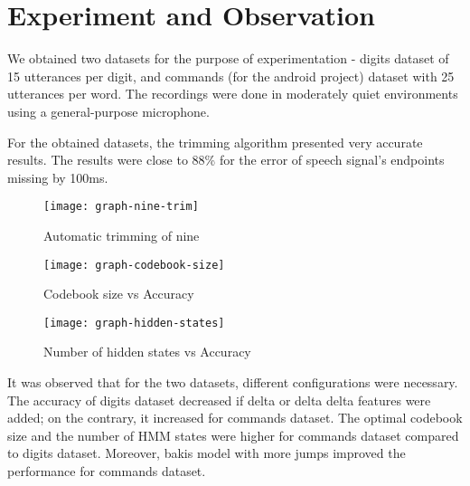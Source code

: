 \chapter{Experiment and Observation} \label{ch:experiment}

We obtained two datasets for the purpose of experimentation - digits dataset of 15 utterances per digit, and commands (for the android project) dataset with 25 utterances per word. The recordings were done in moderately quiet environments using a general-purpose microphone.

For the obtained datasets, the trimming algorithm presented very accurate results. The results were close to 88\% for the error of speech signal's endpoints missing by 100ms.

\begin{figure}
    \centering
    \texttt{[image: graph-nine-trim]}
    \label{fig:graph-nine-trim}
    \caption{Automatic trimming of nine}
\end{figure}

\begin{figure}
    \centering
    \texttt{[image: graph-codebook-size]}
    \label{fig:graph-codebook-size}
    \caption{Codebook size vs Accuracy}
\end{figure}

\begin{figure}
    \centering
    \texttt{[image: graph-hidden-states]}
    \label{fig:graph-hidden-states}
    \caption{Number of hidden states vs Accuracy}
\end{figure}

It was observed that for the two datasets, different configurations were necessary. The accuracy of digits dataset decreased if delta or delta delta features were added; on the contrary, it increased for commands dataset. The optimal codebook size and the number of HMM states were higher for commands dataset compared to digits dataset. Moreover, bakis model with more jumps improved the performance for commands dataset.

\hfill

